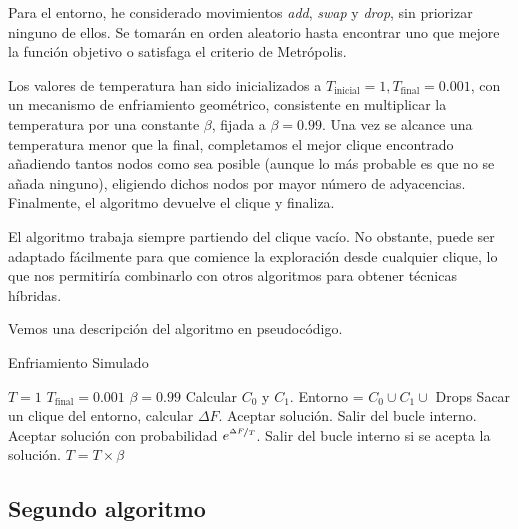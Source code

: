 Para el entorno, he considerado movimientos \textit{add}, \textit{swap} y \textit{drop},
sin priorizar ninguno de ellos. Se tomarán en orden aleatorio hasta encontrar uno que
mejore la función objetivo o satisfaga el criterio de Metrópolis.

Los valores de temperatura han sido inicializados a $T_{\text{inicial}} = 1,
T_{\text{final}} = 0.001$, con un mecanismo de enfriamiento geométrico, consistente
en multiplicar la temperatura por una constante $\beta$, fijada a $\beta = 0.99$.
Una vez se alcance una temperatura menor que la final, completamos el mejor clique
encontrado añadiendo tantos nodos como sea posible (aunque lo más probable es que
no se añada ninguno), eligiendo dichos nodos por mayor número de adyacencias.
Finalmente, el algoritmo devuelve el clique y finaliza.

El algoritmo trabaja siempre partiendo del clique vacío. No obstante, puede ser
adaptado fácilmente para que comience la exploración desde cualquier clique, lo
que nos permitiría combinarlo con otros algoritmos para obtener técnicas híbridas.

Vemos una descripción del algoritmo en pseudocódigo.

\begin{algorithm}[H]
\caption{Enfriamiento Simulado}
  \begin{algorithmic}
    \State $T = 1$
    \State $T_{\text{final}} = 0.001$
    \State $\beta = 0.99$
    \State Calcular $C_0$ y $C_1$.
    \Repeat
      \State Entorno = $C_0 \cup C_1 \cup$ Drops
      \Repeat
        \State Sacar un clique del entorno, calcular $\Delta F$.
          \State Aceptar solución.
          \State Salir del bucle interno.
        \Else
          \State Aceptar solución con probabilidad $e^{\nicefrac{\Delta F}{T}}$.
          \State Salir del bucle interno si se acepta la solución.
        \EndIf
      \State $T = T \times \beta$
  \end{algorithmic}
\end{algorithm}

\subsection{Segundo algoritmo}

